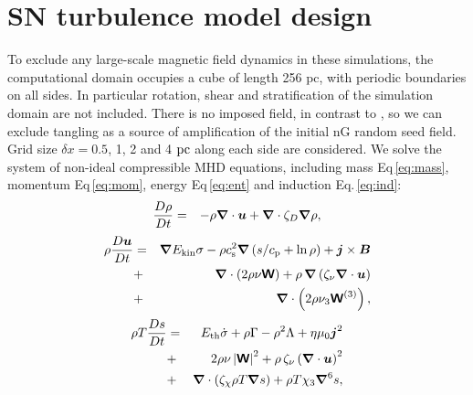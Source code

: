 \documentclass[preprint2]{aastex63}
\newcommand\ESK{E_{\rm kin}}
\newcommand\EST{E_{\rm th}}
\newcommand{\vect}[1]{{{\mbox{\boldmath $#1$}}}}%
\newcommand{\mathbfss}[1]{\textbf{\textsf{#1}}}
\newcommand\pc{~ {\rm pc}}
\begin{document}
\section{SN turbulence model design} \label{sec:model}

To exclude any large-scale magnetic field dynamics in these simulations, the
computational domain occupies a cube of length 256 pc, with periodic boundaries
on all sides.
In particular rotation, shear and stratification of the simulation domain are
not included.
There is no imposed field, in contrast to \citet{BKMM04}, so we can exclude
tangling as a source of amplification of the initial nG random seed field.
Grid size $\delta x=0.5$, 1, 2 and 4$\pc$  along each side are considered.
We solve the system of non-ideal compressible MHD equations, including 
mass Eq\,\eqref{eq:mass}, momentum Eq\,\eqref{eq:mom}, energy Eq\,\eqref{eq:ent} and
induction Eq.\,\eqref{eq:ind}:
  \begin{eqnarray}
  \label{eq:mass}
    \frac{D\rho}{Dt} &=& 
    -\rho \vect\nabla \cdot \vect{u}
    +\vect\nabla \cdot\zeta_D\vect\nabla\rho,
  \end{eqnarray}
  \begin{eqnarray}
  \label{eq:mom}
    \rho\frac{D\vect{u}}{Dt} &=& 
    \vect\nabla{\ESK\sigma}
    -\rho c_{\rm s}^2\vect\nabla\left({s}/{c_{\rm p}}+\ln\rho\right)
    +\vect{j}\times\vect{B}
    \nonumber\\
    &+&\vect\nabla\cdot \left(2\rho\nu{\mathbfss W}\right)
    +\rho\,\vect\nabla\left(\zeta_{\nu}\vect\nabla \cdot \vect{u} \right)
    \nonumber\\
    &+&\vect\nabla\cdot \left(2\rho\nu_3{\mathbfss W}^{(3)}\right),
  \end{eqnarray}
  \begin{eqnarray}
  \label{eq:ent}
    \rho T\frac{D s}{Dt} &=&
     \EST\dot\sigma +\rho\Gamma
    -\rho^2\Lambda +\eta\mu_0\vect{j}^2 
    \nonumber\\
    &+&2 \rho \nu\left|{\mathbfss W}\right|^{2}
    +\rho\,\zeta_{\nu}\left(\vect\nabla \cdot \vect{u} \right)^2
    \nonumber\\
    &+&\vect\nabla\cdot\left(\zeta_\chi\rho T\vect\nabla s\right)
    +\rho T\chi_3\vect\nabla^6 s,
  \end{eqnarray}
\end{document}
